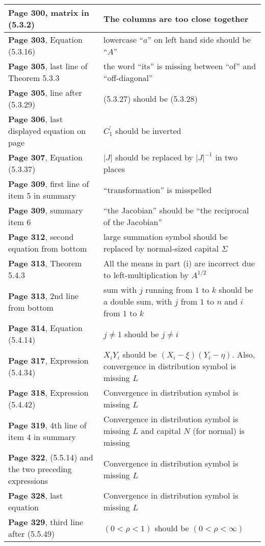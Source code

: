 \documentclass[10pt, a4paper]{article}
\begin{document}
\begin{longtable}{|R{.40\textwidth}|R{.55\textwidth}|}
\textbf{Page 300}, matrix in (5.3.2) & The columns are too close together \\ \hline
\textbf{Page 303}, Equation (5.3.16) & lowercase ``$a$'' on left hand side should be ``$A$'' \\ \hline
\textbf{Page 305}, last line of Theorem 5.3.3 & the word ``its'' is missing between ``of'' and ``off-diagonal'' \\ \hline
\textbf{Page 305}, line after (5.3.29) & (5.3.27) should be (5.3.28) \\ \hline
\textbf{Page 306}, last displayed equation on page & $C^\prime_1$ should be inverted \\ \hline
\textbf{Page 307}, Equation (5.3.37) & $|J|$ should be replaced by $|J|^{-1}$ in two places \\ \hline
\textbf{Page 309}, first line of item 5 in summary & ``transformation'' is misspelled \\ \hline
\textbf{Page 309}, summary item 6 & ``the Jacobian'' should be ``the reciprocal of the Jacobian'' \\ \hline
\textbf{Page 312}, second equation from bottom & large summation symbol should be replaced by normal-sized capital $\Sigma$ \\ \hline
\textbf{Page 313}, Theorem 5.4.3 & All the means in part (i) are incorrect due to left-multiplication by $A^{1/2}$ \\ \hline
\textbf{Page 313}, 2nd line from bottom & sum with $j$ running from $1$ to $k$ should be a double sum, with $j$ from $1$ to $n$ and $i$ from $1$ to $k$ \\ \hline
\textbf{Page 314}, Equation (5.4.14) & $j \neq 1$ should be $j \neq i$ \\ \hline
\textbf{Page 317}, Expression (5.4.34) & $X_i Y_i$ should be $(X_i - \xi)(Y_i - \eta)$. Also, convergence in distribution symbol is missing $L$ \\ \hline
\textbf{Page 318}, Expression (5.4.42) & Convergence in distribution symbol is missing $L$ \\ \hline
\textbf{Page 319}, 4th line of item 4 in summary & Convergence in distribution symbol is missing $L$ and capital $N$ (for normal) is missing \\ \hline
\textbf{Page 322}, (5.5.14) and the two preceding expressions & Convergence in distribution symbol is missing $L$ \\ \hline
\textbf{Page 328}, last equation & Convergence in distribution symbol is missing $L$ \\ \hline
\textbf{Page 329}, third line after (5.5.49) & $(0<\rho<1)$ should be $(0<\rho<\infty)$ \\ \hline

\end{longtable}
\end{document}
